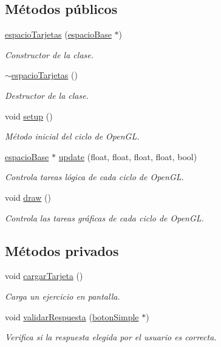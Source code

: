 \subsection*{Métodos públicos}
\begin{DoxyCompactItemize}
\item 
\hyperlink{classespacio_tarjetas_a4fadd23e0a493467f5c28deecdbb975c}{espacio\+Tarjetas} (\hyperlink{classespacio_base}{espacio\+Base} $\ast$)
\begin{DoxyCompactList}\small\item\em Constructor de la clase. \end{DoxyCompactList}\item 
\hyperlink{classespacio_tarjetas_a2b5ef7680cf2193c561814d90fcc1500}{$\sim$espacio\+Tarjetas} ()
\begin{DoxyCompactList}\small\item\em Destructor de la clase. \end{DoxyCompactList}\item 
void \hyperlink{classespacio_tarjetas_a0dc8d9154c4de90daab303a4fab5fd90}{setup} ()
\begin{DoxyCompactList}\small\item\em Método inicial del ciclo de Open\+G\+L. \end{DoxyCompactList}\item 
\hyperlink{classespacio_base}{espacio\+Base} $\ast$ \hyperlink{classespacio_tarjetas_a61d5cd1dcc3538b9eafe7a6ab7d6e6e5}{update} (float, float, float, float, bool)
\begin{DoxyCompactList}\small\item\em Controla tareas lógica de cada ciclo de Open\+G\+L. \end{DoxyCompactList}\item 
void \hyperlink{classespacio_tarjetas_a53e047fce1e887a4dfc49ff31388867d}{draw} ()
\begin{DoxyCompactList}\small\item\em Controla las tareas gráficas de cada ciclo de Open\+G\+L. \end{DoxyCompactList}\end{DoxyCompactItemize}
\subsection*{Métodos privados}
\begin{DoxyCompactItemize}
\item 
void \hyperlink{classespacio_tarjetas_a14b6c40ed3154459f9b1ec511f176613}{cargar\+Tarjeta} ()
\begin{DoxyCompactList}\small\item\em Carga un ejercicio en pantalla. \end{DoxyCompactList}\item 
void \hyperlink{classespacio_tarjetas_a826269ec11513bc1c471d9aa51288a47}{validar\+Respuesta} (\hyperlink{classboton_simple}{boton\+Simple} $\ast$)
\begin{DoxyCompactList}\small\item\em Verifica si la respuesta elegida por el usuario es correcta. \end{DoxyCompactList}\end{DoxyCompactItemize}
